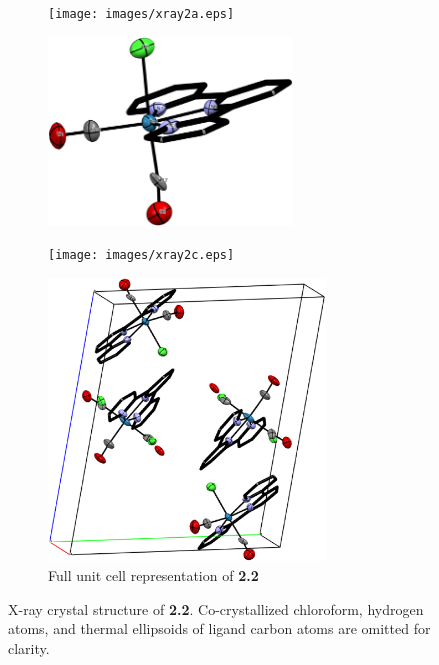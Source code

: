\begin{figure}[!ht]
 \centering
 \begin{subfigure}[b]{0.49\textwidth}
  \texttt{[image: images/xray2a.eps]}
 \end{subfigure}
 \begin{subfigure}[b]{0.49\textwidth}
  \includegraphics[clip=true, width=\textwidth, height=50mm, keepaspectratio]{images/xray2b.eps}
 \end{subfigure}
 \begin{subfigure}[b]{0.49\textwidth}
  \texttt{[image: images/xray2c.eps]}
 \end{subfigure}
 \begin{subfigure}[b]{\textwidth}
  \centering
  \includegraphics[clip=true, width=\textwidth, height=75mm, keepaspectratio]{images/xray2uc.eps}
  \caption{Full unit cell representation of \textbf{2.2}}
 \end{subfigure}
\caption[X-ray crystal structure of \textbf{2.2}]{X-ray crystal structure of \textbf{2.2}. Co-crystallized chloroform, hydrogen atoms, and thermal ellipsoids of ligand carbon atoms are omitted for clarity.}
\label{fig.xray22}
\end{figure}


